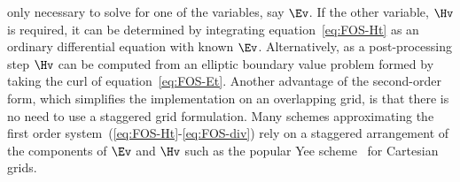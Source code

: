 \documentclass{article}
\begin{document}
only necessary to solve for one of the variables, say $\Ev$. 
If the other variable, $\Hv$ is required, it can be
determined by
integrating equation~\eqref{eq:FOS-Ht} as an ordinary differential equation
with known $\Ev$. Alternatively, as a post-processing step $\Hv$ can be computed from an
elliptic boundary value problem formed by taking the curl of equation~\eqref{eq:FOS-Et}.
Another advantage of the second-order form, which simplifies the implementation on
an overlapping grid, is that there is no need to use a staggered grid formulation. 
Many schemes approximating the first order system~(\ref{eq:FOS-Ht}-\ref{eq:FOS-div}) rely on a
staggered arrangement of the components of $\Ev$ and $\Hv$ such as the
popular Yee scheme~\cite{Yee66} for Cartesian grids. 





\vfill\eject



\printindex
\end{document}
